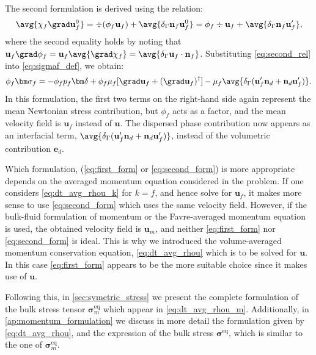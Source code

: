 The second formulation is derived using the relation: 
\begin{equation}
    \avg{\chi_f \grad \textbf{u}_f^0}
    = 
    \div (\phi_f \textbf{u}_f)
    + \avg{\delta_\Gamma \textbf{n}_f \textbf{u}_f^0}
    = 
    \phi_f \div  \textbf{u}_f
    + \avg{\delta_\Gamma \textbf{n}_f \textbf{u}_f'},
    \label{eq:second_rel}
\end{equation}
where the second equality holds by noting that $\textbf{u}_f \grad \phi_f =\textbf{u}_f \avg{\grad \chi_f} =\avg{\delta_\Gamma \textbf{u}_f \cdot \textbf{n}_f}$. 
Substituting \eqref{eq:second_rel} into \eqref{eq:sigmaf_def}, we obtain: 
\begin{equation}
    \phi_f\bm\sigma_f
    = 
    - \phi_f p_f \bm\delta 
    + \phi_f \mu_f [\grad \textbf{u}_f + (\grad \textbf{u}_f)^\dagger] 
    -\mu_f \avg{\delta_\Gamma (\textbf{u}_f'\textbf{n}_d + \textbf{n}_d \textbf{u}_f')}. 
    \label{eq:second_form}
\end{equation}
In this formulation, the first two terms on the right-hand side again represent the mean Newtonian stress contribution, but $\phi_f$ acts as a factor, and the mean velocity field is $\textbf{u}_f$ instead of $\textbf{u}$. 
The dispersed phase contribution now appears as an interfacial term, $\avg{\delta_\Gamma (\textbf{u}_f'\textbf{n}_d + \textbf{n}_d \textbf{u}_f')}$, instead of the volumetric contribution $\textbf{e}_d$. 

Which formulation, (\ref{eq:first_form} or \ref{eq:second_form}) is more appropriate depends on the averaged momentum equation considered in the problem.  
If one considers \ref{eq:dt_avg_rhou_k} for $k=f$, and hence solve for $\textbf{u}_f$, it makes more sense to use \ref{eq:second_form} which uses the same velocity field.
However, if the bulk-fluid formulation of momentum or the Favre-averaged momentum equation is used, the obtained velocity field is $\textbf{u}_m$, and neither \ref{eq:first_form} nor \ref{eq:second_form} is ideal. 
This is why we introduced the volume-averaged momentum conservation equation, \eqref{eq:dt_avg_rhou} which is to be solved for $\textbf{u}$. 
In this case \ref{eq:first_form} appears to be the more suitable choice since it makes use of $\textbf{u}$. 


Following this, in \ref{sec:symetric_stress} we present the complete formulation of the bulk stress tensor $\bm\sigma_m^\text{eq}$ which appear in \ref{eq:dt_avg_rhou_m}. 
Additionally, in \ref{ap:momentum_formulation} we discuss in more detail the formulation given by \ref{eq:dt_avg_rhou}, and the expression of the bulk stress $\bm\sigma^\text{eq}$, which is similar to the one of $\bm\sigma_m^\text{eq}$. 